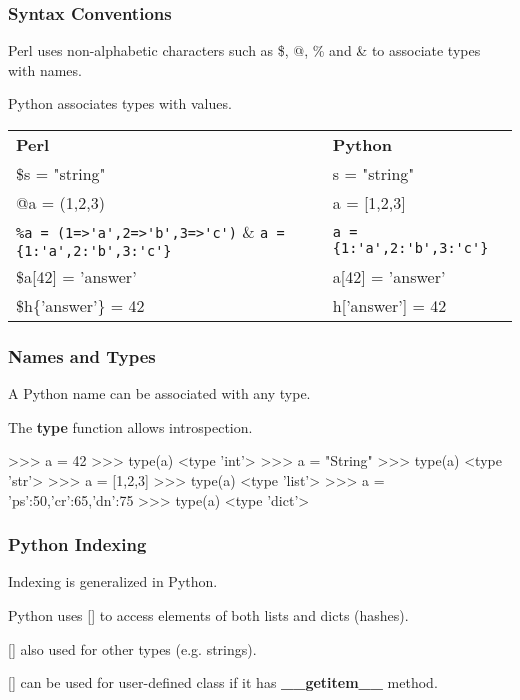 \begin{frame}[fragile]
\frametitle{Syntax Conventions}
Perl uses non-alphabetic characters such as \$, @, \% and \& to associate 
types with names. 

Python associates types with values.

\begin{center}
\begin{tabular}{ll}

{\bf Perl}                         & {\bf Python} \\

\$s = "string"                     & s = "string" \\
@a = (1,2,3)                       & a = [1,2,3] \\
\verb|%a = (1=>'a',2=>'b',3=>'c')| & \verb|a = {1:'a',2:'b',3:'c'}| \\
\$a[42] = 'answer'                 & a[42] = 'answer' \\
\$h\{'answer'\} = 42               & h['answer'] = 42 \\

\end{tabular}
\end{center}

\end{frame}

\begin{frame}[fragile]
\frametitle{Names and Types}

A Python name can be associated with any type.

The {\bf type} function allows introspection.

\begin{python}
>>> a = 42
>>> type(a)
<type 'int'>
>>> a = "String"
>>> type(a)
<type 'str'>
>>> a = [1,2,3]
>>> type(a)
<type 'list'>
>>> a = {'ps':50,'cr':65,'dn':75}
>>> type(a)
<type 'dict'>
\end{python}

\end{frame}

\begin{frame}[fragile]
\frametitle{Python Indexing}

Indexing is generalized in Python.

Python uses [] to access elements of both lists and dicts (hashes).

[] also used for other types (e.g. strings).

[] can be used for user-defined  class if it has {\bf \_\_getitem\_\_} method.

\end{frame}

